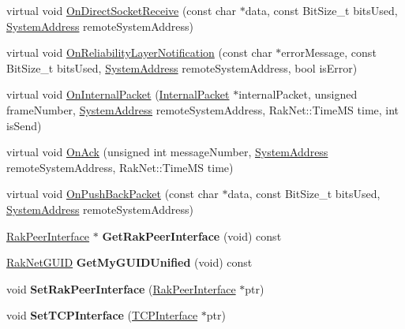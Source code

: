 \begin{DoxyCompactItemize}
\item 
virtual void \hyperlink{class_rak_net_1_1_plugin_interface2_a9aac1101ad58e8443516588e96e066ec}{On\-Direct\-Socket\-Receive} (const char $\ast$data, const Bit\-Size\-\_\-t bits\-Used, \hyperlink{struct_rak_net_1_1_system_address}{System\-Address} remote\-System\-Address)
\item 
virtual void \hyperlink{class_rak_net_1_1_plugin_interface2_abf51e60546bd74d21c91dc0d6f9f3a4b}{On\-Reliability\-Layer\-Notification} (const char $\ast$error\-Message, const Bit\-Size\-\_\-t bits\-Used, \hyperlink{struct_rak_net_1_1_system_address}{System\-Address} remote\-System\-Address, bool is\-Error)
\item 
virtual void \hyperlink{class_rak_net_1_1_plugin_interface2_a399b8c93daa0236599961e754742e2f7}{On\-Internal\-Packet} (\hyperlink{struct_rak_net_1_1_internal_packet}{Internal\-Packet} $\ast$internal\-Packet, unsigned frame\-Number, \hyperlink{struct_rak_net_1_1_system_address}{System\-Address} remote\-System\-Address, Rak\-Net\-::\-Time\-M\-S time, int is\-Send)
\item 
virtual void \hyperlink{class_rak_net_1_1_plugin_interface2_ae0b0cad31cfc209c48197c77d6b46345}{On\-Ack} (unsigned int message\-Number, \hyperlink{struct_rak_net_1_1_system_address}{System\-Address} remote\-System\-Address, Rak\-Net\-::\-Time\-M\-S time)
\item 
virtual void \hyperlink{class_rak_net_1_1_plugin_interface2_a5c976aea56ed85055a17c19d91b90727}{On\-Push\-Back\-Packet} (const char $\ast$data, const Bit\-Size\-\_\-t bits\-Used, \hyperlink{struct_rak_net_1_1_system_address}{System\-Address} remote\-System\-Address)
\item 
\hypertarget{class_rak_net_1_1_plugin_interface2_a3c42791b96c993e01da713385685d3a6}{\hyperlink{class_rak_net_1_1_rak_peer_interface}{Rak\-Peer\-Interface} $\ast$ {\bfseries Get\-Rak\-Peer\-Interface} (void) const }\label{class_rak_net_1_1_plugin_interface2_a3c42791b96c993e01da713385685d3a6}

\item 
\hypertarget{class_rak_net_1_1_plugin_interface2_a158e246e12f31a26f718caaf4b9b8cd1}{\hyperlink{struct_rak_net_1_1_rak_net_g_u_i_d}{Rak\-Net\-G\-U\-I\-D} {\bfseries Get\-My\-G\-U\-I\-D\-Unified} (void) const }\label{class_rak_net_1_1_plugin_interface2_a158e246e12f31a26f718caaf4b9b8cd1}

\item 
\hypertarget{class_rak_net_1_1_plugin_interface2_af17993e0e2d940b137ec5e6a55540a00}{void {\bfseries Set\-Rak\-Peer\-Interface} (\hyperlink{class_rak_net_1_1_rak_peer_interface}{Rak\-Peer\-Interface} $\ast$ptr)}\label{class_rak_net_1_1_plugin_interface2_af17993e0e2d940b137ec5e6a55540a00}

\item 
\hypertarget{class_rak_net_1_1_plugin_interface2_a7e3cf3a212e0c15a067f69ccc493046a}{void {\bfseries Set\-T\-C\-P\-Interface} (\hyperlink{class_rak_net_1_1_t_c_p_interface}{T\-C\-P\-Interface} $\ast$ptr)}\label{class_rak_net_1_1_plugin_interface2_a7e3cf3a212e0c15a067f69ccc493046a}

\end{DoxyCompactItemize}
